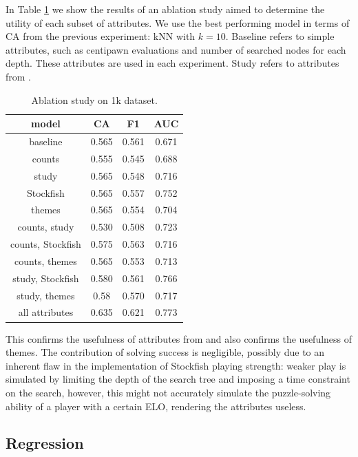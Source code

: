 \documentclass[sigconf,nonacm]{acmart}
\begin{document}
In Table \ref{class} we show the results of an ablation study aimed to determine the utility of each subset of attributes. We use the best performing model in terms of CA from the previous experiment: kNN with $k=10$. Baseline refers to simple attributes, such as centipawn evaluations and number of searched nodes for each depth. These attributes are used in each experiment. Study refers to attributes from \cite{bratko3}.

\begin{center}
\begin{table}[!ht]
\caption{Ablation study on 1k dataset.
\label{class}}
\centering
{\begin{tabular}{c|c|c|c}
model & CA & F1 & AUC \\ \hline
baseline & 0.565 & 0.561 & 0.671 \\
counts & 0.555 & 0.545 & 0.688 \\
study & 0.565 & 0.548 & 0.716 \\
Stockfish & 0.565 & 0.557 & 0.752 \\
themes & 0.565 & 0.554 & 0.704  \\
counts, study & 0.530 & 0.508 & 0.723 \\
counts, Stockfish & 0.575 & 0.563 & 0.716 \\
counts, themes & 0.565 & 0.553 & 0.713 \\
study, Stockfish & 0.580 & 0.561 & 0.766 \\
study, themes & 0.58 & 0.570 & 0.717 \\
all attributes & 0.635 & 0.621 & 0.773 \\
\end{tabular}}
\end{table}
\end{center}

This confirms the usefulness of attributes from \cite{bratko3} and also confirms the usefulness of themes. The contribution of solving success is negligible, possibly due to an inherent flaw in the implementation of Stockfish playing strength: weaker play is simulated by limiting the depth of the search tree and imposing a time constraint on the search, however, this might not accurately simulate the puzzle-solving ability of a player with a certain ELO, rendering the attributes useless. 

\subsection{Regression}
\end{document}
